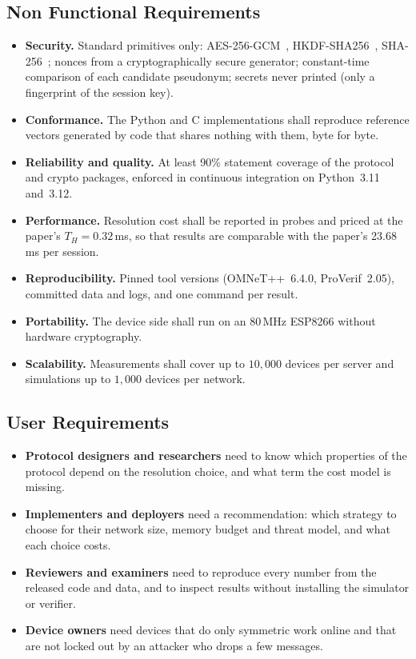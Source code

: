 \subsection{Non Functional Requirements}
\begin{itemize}
\item \textbf{Security.} Standard primitives only: AES-256-GCM~\cite{gcm}, HKDF-SHA256~\cite{hkdf}, SHA-256~\cite{fips180}; nonces from a cryptographically secure generator; constant-time comparison of each candidate pseudonym; secrets never printed (only a fingerprint of the session key).
\item \textbf{Conformance.} The Python and C implementations shall reproduce reference vectors generated by code that shares nothing with them, byte for byte.
\item \textbf{Reliability and quality.} At least 90\% statement coverage of the protocol and crypto packages, enforced in continuous integration on Python~3.11 and~3.12.
\item \textbf{Performance.} Resolution cost shall be reported in probes and priced at the paper's $T_H=0.32$\,ms, so that results are comparable with the paper's 23.68\,ms per session.
\item \textbf{Reproducibility.} Pinned tool versions (OMNeT++~6.4.0, ProVerif~2.05), committed data and logs, and one command per result.
\item \textbf{Portability.} The device side shall run on an 80\,MHz ESP8266 without hardware cryptography.
\item \textbf{Scalability.} Measurements shall cover up to $10{,}000$ devices per server and simulations up to $1{,}000$ devices per network.
\end{itemize}

\subsection{User Requirements}
\begin{itemize}
\item \textbf{Protocol designers and researchers} need to know which properties of the protocol depend on the resolution choice, and what term the cost model is missing.
\item \textbf{Implementers and deployers} need a recommendation: which strategy to choose for their network size, memory budget and threat model, and what each choice costs.
\item \textbf{Reviewers and examiners} need to reproduce every number from the released code and data, and to inspect results without installing the simulator or verifier.
\item \textbf{Device owners} need devices that do only symmetric work online and that are not locked out by an attacker who drops a few messages.
\end{itemize}

